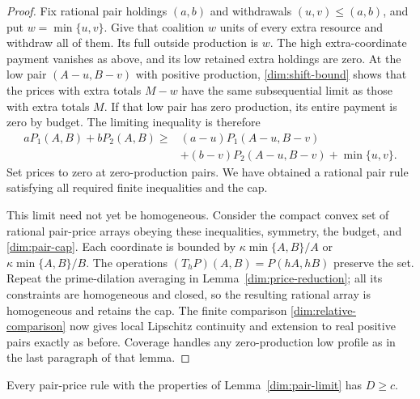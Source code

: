 \begin{proof}
Fix rational pair holdings $(a,b)$ and withdrawals $(u,v)\le(a,b)$,
and put $w=\min\{u,v\}$. Give that coalition $w$ units of every extra
resource and withdraw all of them. Its full outside production is $w$.
The high extra-coordinate payment vanishes as above, and its low retained
extra holdings are zero. At the low pair $(A-u,B-v)$ with positive
production, \eqref{dim:shift-bound} shows that the prices with extra totals
$M-w$ have the same subsequential limit as those with extra totals $M$.
If that low pair has zero production, its entire payment is zero by budget.
The limiting inequality is therefore
\begin{align*}
 aP_1(A,B)+bP_2(A,B)
 \ge{}&(a-u)P_1(A-u,B-v)\\
 &+(b-v)P_2(A-u,B-v)+\min\{u,v\}.
\end{align*}
Set prices to zero at zero-production pairs. We have obtained a rational
pair rule satisfying all required finite inequalities and the cap.

This limit need not yet be homogeneous. Consider the compact convex set
of rational pair-price arrays obeying these inequalities, symmetry, the
budget, and \eqref{dim:pair-cap}. Each coordinate is bounded by
$\kappa\min\{A,B\}/A$ or $\kappa\min\{A,B\}/B$.
The operations $(T_hP)(A,B)=P(hA,hB)$ preserve the set. Repeat the
prime-dilation averaging in Lemma~\ref{dim:price-reduction}; all its
constraints are homogeneous and closed, so the resulting rational array
is homogeneous and retains the cap. The finite comparison
\eqref{dim:relative-comparison} now gives local Lipschitz continuity and
extension to real positive pairs exactly as before. Coverage handles any
zero-production low profile as in the last paragraph of that lemma.
\end{proof}

\begin{lemma}\label{dim:pair-obstruction}
Every pair-price rule with the properties of
Lemma~\ref{dim:pair-limit} has $D\ge c$.
\end{lemma}

